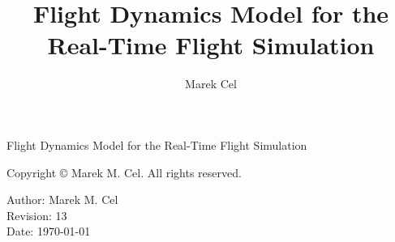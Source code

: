 \documentclass[12pt,a4paper]{report}
\title{Flight Dynamics Model for the Real-Time Flight Simulation}
\author{Marek Cel}
\date{}
\begin{document}
  
  \begin{titlepage}
    \centering
    {\huge Flight Dynamics Model for the Real-Time Flight Simulation\par}
  \end{titlepage}
  

  \noindent Copyright \copyright{} \the\year{} Marek M. Cel. All rights reserved.

  \noindent Author: Marek M. Cel \\
  Revision: 13 \\
  Date: \today

  
  
  {
    \clearpage
    \setlength{\parskip}{0em}
    \tableofcontents
  }

  
  
  
  
  
  
  
  
  
  \clearpage
   
  
  
\end{document}
